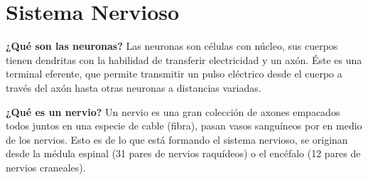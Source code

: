 \section{Sistema Nervioso}


\textbf{¿Qué son las neuronas?} 
Las neuronas son células con núcleo, sus cuerpos tienen dendritas con la habilidad de transferir electricidad y un axón.  Éste es una terminal eferente, que permite transmitir un pulso eléctrico desde el cuerpo a través del axón hasta otras neuronas a distancias variadas.


\textbf{¿Qué es un nervio?}
Un nervio es una gran colección de axones empacados todos juntos en una especie de cable (fibra), pasan vasos sanguíneos por en medio de los nervios. Esto es de lo que está formando el sistema nervioso, se originan desde la médula espinal (31 pares de nervios raquídeos) o el encéfalo (12 pares de nervios craneales).






